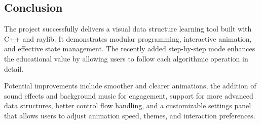 \begin{flushleft}
\section{Conclusion}
The project successfully delivers a visual data structure learning tool built with C++ and raylib. It demonstrates modular programming, interactive animation, and effective state management. The recently added step-by-step mode enhances the educational value by allowing users to follow each algorithmic operation in detail.

Potential improvements include smoother and clearer animations, the addition of sound effects and background music for engagement, support for more advanced data structures, better control flow handling, and a customizable settings panel that allows users to adjust animation speed, themes, and interaction preferences.
\end{flushleft}